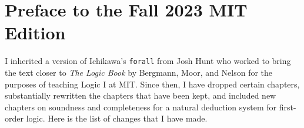 
\chapter*{Preface to the Fall 2023 MIT Edition}
\label{ch.preface2}

I inherited a version of Ichikawa's {\tt forall} from Josh Hunt who worked to bring the text closer to \textit{The Logic Book} by Bergmann, Moor, and Nelson for the purposes of teaching Logic I at MIT.
Since then, I have dropped certain chapters, substantially rewritten the chapters that have been kept, and included new chapters on soundness and completeness for a natural deduction system for first-order logic.
Here is the list of changes that I have made. %

